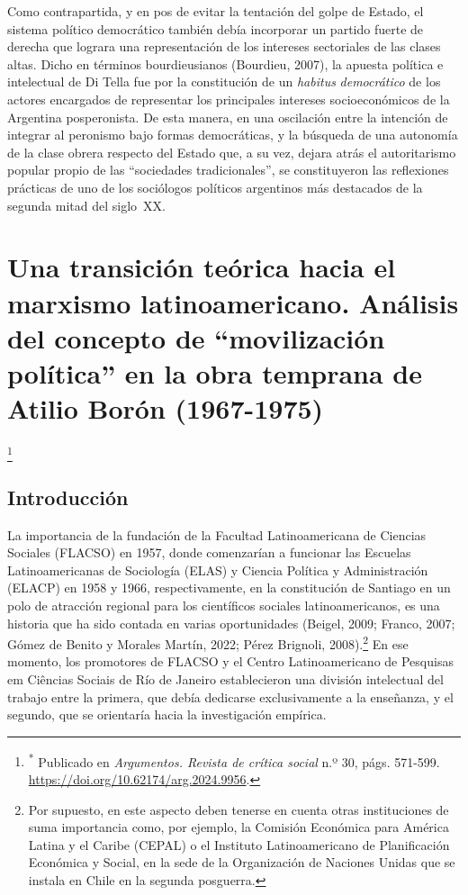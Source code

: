 Como contrapartida, y en pos de evitar la tentación del golpe de Estado, el sistema político democrático también debía incorporar un partido fuerte de derecha que lograra una representación de los intereses sectoriales de las clases altas. Dicho en términos bourdieusianos (Bourdieu, 2007), la apuesta política e intelectual de Di Tella fue por la constitución de un \emph{habitus} \emph{democrático} de los actores encargados de representar los principales intereses socioeconómicos de la Argentina posperonista. De esta manera, en una oscilación entre la intención de integrar al peronismo bajo formas democráticas, y la búsqueda de una autonomía de la clase obrera respecto del Estado que, a su vez, dejara atrás el autoritarismo popular propio de las ``sociedades tradicionales'', se constituyeron las reflexiones prácticas de uno de los sociólogos políticos argentinos más destacados de la segunda mitad del siglo~XX.

\chapter{Una transición teórica hacia el marxismo latinoamericano. Análisis del concepto de ``movilización política'' en la obra temprana de Atilio Borón (1967-1975)}

\footnote{\textsuperscript{*} Publicado en \emph{Argumentos. Revista de crítica social} n.º 30, págs. 571-599. \url{https://doi.org/10.62174/arg.2024.9956}.}

\section{Introducción}

La importancia de la fundación de la Facultad Latinoamericana de Ciencias Sociales (FLACSO) en 1957, donde comenzarían a funcionar las Escuelas Latinoamericanas de Sociología (ELAS) y Ciencia Política y Administración (ELACP) en 1958 y 1966, respectivamente, en la constitución de Santiago en un polo de atracción regional para los científicos sociales latinoamericanos, es una historia que ha sido contada en varias oportunidades (Beigel, 2009; Franco, 2007; Gómez de Benito y Morales Martín, 2022; Pérez Brignoli, 2008).\footnote{Por supuesto, en este aspecto deben tenerse en cuenta otras instituciones de suma importancia como, por ejemplo, la Comisión Económica para América Latina y el Caribe (CEPAL) o el Instituto Latinoamericano de Planificación Económica y Social, en la sede de la Organización de Naciones Unidas que se instala en Chile en la segunda posguerra.} En ese momento, los promotores de FLACSO y el Centro Latinoamericano de Pesquisas em Ciências Sociais de Río de Janeiro establecieron una división intelectual del trabajo entre la primera, que debía dedicarse exclusivamente a la enseñanza, y el segundo, que se orientaría hacia la investigación empírica.

